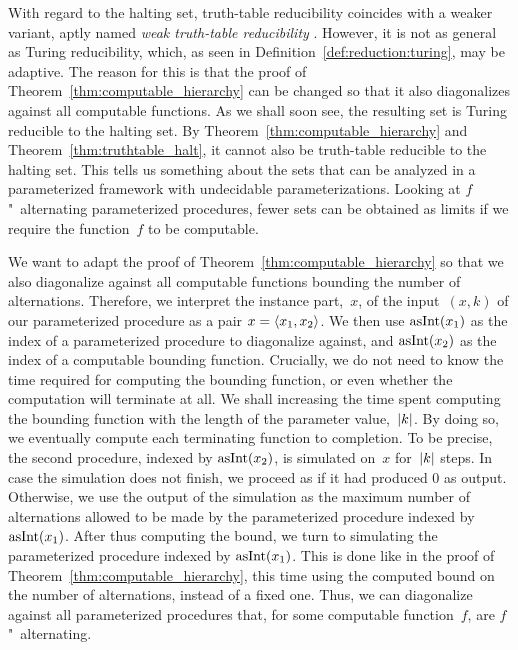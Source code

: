 With regard to the halting set, truth-table reducibility coincides with a weaker variant, aptly named \emph{weak truth-table reducibility} \parencite{odifreddi1992classical,downey2010algorithmic}.
However, it is not as general as Turing reducibility, which, as seen in Definition~\ref{def:reduction:turing}, may be adaptive.
The reason for this is that the proof of Theorem~\ref{thm:computable_hierarchy} can be changed so that it also diagonalizes against all computable functions.
As we shall soon see, the resulting set is Turing reducible to the halting set.
By Theorem~\ref{thm:computable_hierarchy} and Theorem~\ref{thm:truthtable_halt}, it cannot also be truth-table reducible to the halting set.
This tells us something about the sets that can be analyzed in a parameterized framework with undecidable parameterizations.
Looking at $f$"~alternating parameterized procedures, fewer sets can be obtained as limits if we require the function~$f$ to be computable.

We want to adapt the proof of Theorem~\ref{thm:computable_hierarchy} so that we also diagonalize against all computable functions bounding the number of alternations.
Therefore, we interpret the instance part,~$x$, of the input~$(x, k)$ of our parameterized procedure as a pair $x = {\langle x_1, x_2\rangle}$.
We then use $\operatorname{asInt}(x_1)$ as the index of a parameterized procedure to diagonalize against, and $\operatorname{asInt}(x_2)$ as the index of a computable bounding function.
Crucially, we do not need to know the time required for computing the bounding function, or even whether the computation will terminate at all.
We shall increasing the time spent computing the bounding function with the length of the parameter value,~${\lvert k\rvert}$.
By doing so, we eventually compute each terminating function to completion.
To be precise, the second procedure, indexed by $\operatorname{asInt}(x_2)$, is simulated on~$x$ for~${\lvert k\rvert}$ steps.
In case the simulation does not finish, we proceed as if it had produced $0$ as output.
Otherwise, we use the output of the simulation as the maximum number of alternations allowed to be made by the parameterized procedure indexed by $\operatorname{asInt}(x_1)$.
After thus computing the bound, we turn to simulating the parameterized procedure indexed by $\operatorname{asInt}(x_1)$.
This is done like in the proof of Theorem~\ref{thm:computable_hierarchy}, this time using the computed bound on the number of alternations, instead of a fixed one.
Thus, we can diagonalize against all parameterized procedures that, for some computable function~$f$, are $f$"~alternating.

